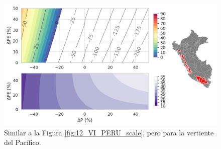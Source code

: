 \begin{figure}[ht!]
	\includegraphics[scale=.75]{Images/12_VI_Nivel_scale_Pacific.png}
	\centering
	\caption{Similar a la Figura \ref{fig:12_VI_PERU_scale}, pero para la vertiente del Pacífico.}
	\label{fig:12_VI_Nivel_scale_Pacific}
\end{figure}

